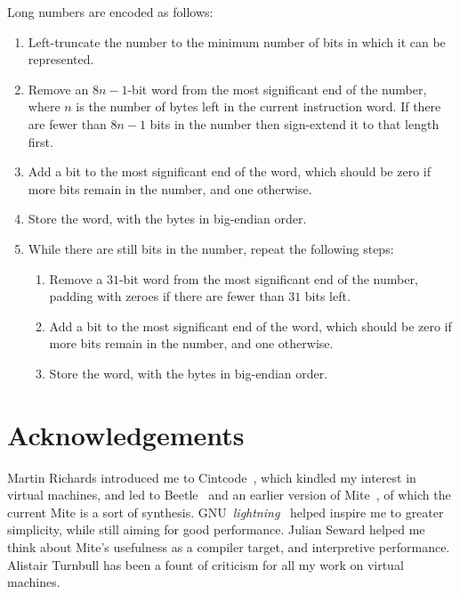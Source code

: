 \documentclass[english]{scrartcl}
\begin{document}
Long numbers are encoded as follows:

\begin{enumerate}
\item Left-truncate the number to the minimum number of bits in which it can
be represented.

\item Remove an $8n-1$-bit word from the most significant end of the number,
where $n$ is the number of bytes left in the current instruction word. If
there are fewer than $8n-1$ bits in the number then sign-extend it to that
length first.

\item Add a bit to the most significant end of the word, which should be
zero if more bits remain in the number, and one otherwise.

\item Store the word, with the bytes in big-endian order.

\item While there are still bits in the number, repeat the following steps:

\begin{enumerate}

\item Remove a $31$-bit word from the most significant end of the number,
padding with zeroes if there are fewer than $31$ bits left.

\item Add a bit to the most significant end of the word, which should be
zero if more bits remain in the number, and one otherwise.

\item Store the word, with the bytes in big-endian order.
\end{enumerate}

\end{enumerate}



\section{Acknowledgements}

Martin Richards introduced me to Cintcode~\cite{cintcode}, which kindled my
interest in virtual machines, and led to Beetle~\cite{beetledis} and an
earlier version of Mite~\cite{mite}, of which the current Mite is a sort of
synthesis. GNU~\emph{lightning}~\cite{lightning} helped inspire me to
greater simplicity, while still aiming for good performance. Julian Seward
helped me think about Mite's usefulness as a compiler target, and
interpretive performance. Alistair Turnbull has been a fount of criticism
for all my work on virtual machines.




\end{document}
